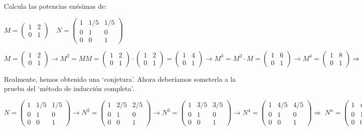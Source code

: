\begin{ejem}
Calcula las potencias enésimas de: 

$M=\left( \begin{matrix} 1&2\\0&1 \end{matrix} \right) \quad N=\left( \begin{matrix} 1&1/5&1/5 \\ 0&1&0 \\ 0&0&1 \end{matrix} \right)$

$M=\left( \begin{matrix} 1&2\\0&1 \end{matrix} \right) \to M^2=MM=\left( \begin{matrix} 1&2\\0&1 \end{matrix} \right) \cdot \left( \begin{matrix} 1&2\\0&1 \end{matrix} \right) =\left( \begin{matrix} 1&4\\0&1 \end{matrix} \right) \to M^3=M^2\cdot M= \left( \begin{matrix} 1&6\\0&1 \end{matrix} \right) \to M^4=\left( \begin{matrix} 1&8\\0&1 \end{matrix} \right) \Rightarrow  \; M^n=\left( \begin{matrix} 1&2n\\0&1 \end{matrix} \right)\;  $ 

Realmente, hemos obtenido una `conjetura'. Ahora deberíamos someterla a la prueba del `método de inducción completa'.

$N=\left( \begin{matrix} 1&1/5&1/5 \\ 0&1&0 \\ 0&0&1 \end{matrix} \right) \to N^2=\left( \begin{matrix} 1&2/5&2/5 \\ 0&1&0 \\ 0&0&1 \end{matrix} \right) \to N^3=\left( \begin{matrix} 1&3/5&3/5 \\ 0&1&0 \\ 0&0&1 \end{matrix} \right)\to N^4=\left( \begin{matrix} 1&4/5&4/5 \\ 0&1&0 \\ 0&0&1 \end{matrix} \right) \Rightarrow \; N^n=\left( \begin{matrix} 1&n/5&n/5 \\ 0&1&0 \\ 0&0&1 \end{matrix} \right)\; $


\end{ejem}

